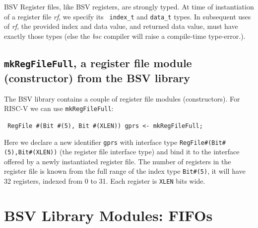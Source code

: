 \vspace{2ex}

BSV Register files, like BSV registers, are strongly typed.  At time
of instantiation of a register file \emph{rf}, we specify its {\tt
index\_t} and {\tt data\_t} types.  In subsequent uses of \emph{rf},
the provided index and data value, and returned data value, must have
exactly those types (else the \emph{bsc} compiler will raise a
compile-time type-error.).


\subsection{{\tt mkRegFileFull}, a register file module (constructor) from the BSV library}

\label{Sec_RegFile_module}


The BSV library contains a couple of register file modules
(constructors). For RISC-V we can use {\tt mkRegFileFull}:


\begin{tabbing}\small\tt
\hmm RegFile \#(Bit \#(5), Bit \#(XLEN)) gprs <- mkRegFileFull;
\end{tabbing}

Here we declare a new identifier \verb|gprs| with interface type
\verb|RegFile#(Bit#(5),Bit#(XLEN))| (the register file interface type)
and bind it to the interface offered by a newly instantiated register
file.  The number of registers in the register file is known from the
full range of the index type \verb|Bit#(5)|, {\ie} it will have 32
registers, indexed from 0 to 31.  Each register is \verb|XLEN| bits
wide.


\section{BSV Library Modules: FIFOs}


